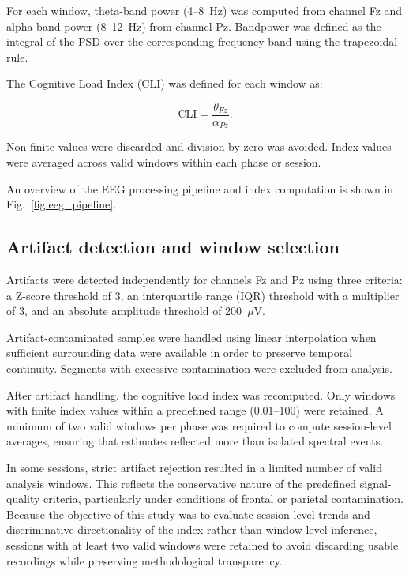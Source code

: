 \documentclass[10pt]{iopart}
\begin{document}
For each window, theta-band power (4--8~Hz) was computed from channel Fz and alpha-band power (8--12~Hz) from channel Pz. Bandpower was defined as the integral of the PSD over the corresponding frequency band using the trapezoidal rule.

The Cognitive Load Index (CLI) was defined for each window as:

\begin{equation}
\mathrm{CLI} = \frac{\theta_{Fz}}{\alpha_{Pz}}.
\label{eq:cli}
\end{equation}

Non-finite values were discarded and division by zero was avoided. Index values were averaged across valid windows within each phase or session.

An overview of the EEG processing pipeline and index computation is shown in Fig.~\ref{fig:eeg_pipeline}.

\subsection{Artifact detection and window selection}

Artifacts were detected independently for channels Fz and Pz using three criteria: a Z-score threshold of 3, an interquartile range (IQR) threshold with a multiplier of 3, and an absolute amplitude threshold of 200~$\mu$V.

Artifact-contaminated samples were handled using linear interpolation when sufficient surrounding data were available in order to preserve temporal continuity. Segments with excessive contamination were excluded from analysis.

After artifact handling, the cognitive load index was recomputed. Only windows with finite index values within a predefined range (0.01--100) were retained. A minimum of two valid windows per phase was required to compute session-level averages, ensuring that estimates reflected more than isolated spectral events.

In some sessions, strict artifact rejection resulted in a limited number of valid analysis windows. This reflects the conservative nature of the predefined signal-quality criteria, particularly under conditions of frontal or parietal contamination. Because the objective of this study was to evaluate session-level trends and discriminative directionality of the index rather than window-level inference, sessions with at least two valid windows were retained to avoid discarding usable recordings while preserving methodological transparency.
\end{document}
